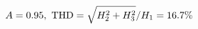 \documentclass[preview]{standalone}
\begin{document}
\begin{align*}
\special{dvisvgm:raw <g id='unique000'>}A=0.95,\ \text{THD}=\sqrt{H_2^2+H_3^2}/H_1=16.7\%\special{dvisvgm:raw </g>}
\end{align*}
\end{document}

